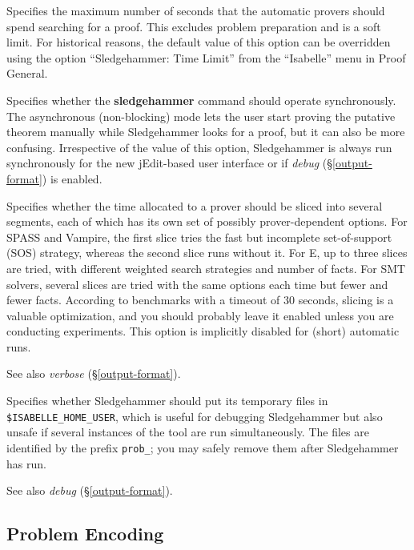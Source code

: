 \documentclass[a4paper,12pt]{article}
\begin{document}
\begin{enum}
Specifies the maximum number of seconds that the automatic provers should spend
searching for a proof. This excludes problem preparation and is a soft limit.
For historical reasons, the default value of this option can be overridden using
the option ``Sledgehammer: Time Limit'' from the ``Isabelle'' menu in Proof
General.

Specifies whether the \textbf{sledgehammer} command should operate
synchronously. The asynchronous (non-blocking) mode lets the user start proving
the putative theorem manually while Sledgehammer looks for a proof, but it can
also be more confusing. Irrespective of the value of this option, Sledgehammer
is always run synchronously for the new jEdit-based user interface or if
\textit{debug} (\S\ref{output-format}) is enabled.

Specifies whether the time allocated to a prover should be sliced into several
segments, each of which has its own set of possibly prover-dependent options.
For SPASS and Vampire, the first slice tries the fast but incomplete
set-of-support (SOS) strategy, whereas the second slice runs without it. For E,
up to three slices are tried, with different weighted search strategies and
number of facts. For SMT solvers, several slices are tried with the same options
each time but fewer and fewer facts. According to benchmarks with a timeout of
30 seconds, slicing is a valuable optimization, and you should probably leave it
enabled unless you are conducting experiments. This option is implicitly
disabled for (short) automatic runs.

\nopagebreak
{\small See also \textit{verbose} (\S\ref{output-format}).}

Specifies whether Sledgehammer should put its temporary files in
\texttt{\$ISA\-BELLE\_\allowbreak HOME\_\allowbreak USER}, which is useful for
debugging Sledgehammer but also unsafe if several instances of the tool are run
simultaneously. The files are identified by the prefix \texttt{prob\_}; you may
safely remove them after Sledgehammer has run.

\nopagebreak
{\small See also \textit{debug} (\S\ref{output-format}).}
\end{enum}

\subsection{Problem Encoding}
\label{problem-encoding}
\end{document}

